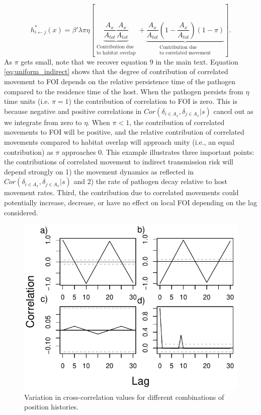 \documentclass[letterpaper]{article}
\begin{document}
\begin{equation}
    h^*_{i \leftarrow j}(x) = \beta' \lambda \pi \eta \left[ \underbrace{\frac{A_x}{A_{tot}}\frac{A_x}{A_{tot}}}_{\substack{\text{Contribution due} \\ \text{to habitat overlap}}} + \underbrace{\frac{A_x}{A_{tot}}(1 - \frac{A_x}{A_{tot}}) (1 - \pi)}_{\substack{\text{Contribution due} \\ \text{to correlated movement}}} \right].
    \label{eq:uniform_indirect}
\end{equation}
As $\pi$ gets small, note that we recover equation 9 in the main text.  Equation \ref{eq:uniform_indirect} shows that the degree of contribution of correlated movement to FOI depends on the relative persistence time of the pathogen compared to the residence time of the host.  
When the pathogen persists from $\eta$ time units (i.e. $\pi = 1$) the contribution of correlation to FOI is zero.  This is because negative and positive correlations in $Cor(\delta_{i \in A_x}, \delta_{j \in A_x} | s)$ cancel out as we integrate from zero to $\eta$.  
When $\pi < 1$, the contribution of correlated movements to FOI will be positive, and the relative contribution of correlated movements compared to habitat overlap will approach unity (i.e., an equal contribution) as $\pi$ approaches 0. 
This example illustrates three important points: the contributions of correlated movement to indirect transmission risk will depend strongly on 1) the movement dynamics as reflected in $Cor(\delta_{i \in A_x}, \delta_{j \in A_x} | s)$ and 2) the rate of pathogen decay relative to host movement rates.  Third, the contribution due to correlated movements could potentially increase, decrease, or have no effect on local FOI depending on the lag considered.  



\begin{figure}
    \includegraphics[width=\textwidth]{figures/example_xcorrs.pdf}
    \caption{Variation in cross-correlation values for different combinations of position histories. }
    \label{fig:xcorrs}
\end{figure}
\end{document}
